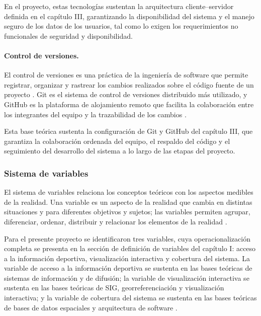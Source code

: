 En el proyecto, estas tecnolog\'ias sustentan la arquitectura cliente--servidor
definida en el cap\'itulo III, garantizando la disponibilidad del sistema y el
manejo seguro de los datos de los usuarios, tal como lo exigen los
requerimientos no funcionales de seguridad y disponibilidad.

\paragraph{Control de versiones.} El control de versiones es una pr\'actica de
la ingenier\'ia de software que permite registrar, organizar y rastrear los
cambios realizados sobre el c\'odigo fuente de un proyecto \citep{gitdocs}. Git
es el sistema de control de versiones distribuido m\'as utilizado, y GitHub es
la plataforma de alojamiento remoto que facilita la colaboraci\'on entre los
integrantes del equipo y la trazabilidad de los cambios \citep{githubdocs}.

Esta base te\'orica sustenta la configuraci\'on de Git y GitHub del cap\'itulo
III, que garantiza la colaboraci\'on ordenada del equipo, el respaldo del
c\'odigo y el seguimiento del desarrollo del sistema a lo largo de las etapas
del proyecto.

\subsubsection{Sistema de variables}

El sistema de variables relaciona los conceptos te\'oricos con los aspectos
medibles de la realidad. Una variable es un aspecto de la realidad que cambia
en distintas situaciones y para diferentes objetivos y sujetos; las variables
permiten agrupar, diferenciar, ordenar, distribuir y relacionar los elementos
de la realidad \citep{hernandez2014}.

Para el presente proyecto se identificaron tres variables, cuya
operacionalizaci\'on completa se presenta en la secci\'on de definici\'on de
variables del cap\'itulo I: acceso a la informaci\'on deportiva, visualizaci\'on
interactiva y cobertura del sistema. La variable de acceso a la informaci\'on
deportiva se sustenta en las bases te\'oricas de sistemas de informaci\'on y de
difusi\'on; la variable de visualizaci\'on interactiva se sustenta en las bases
te\'oricas de SIG, georreferenciaci\'on y visualizaci\'on interactiva; y la
variable de cobertura del sistema se sustenta en las bases te\'oricas de bases
de datos espaciales y arquitectura de software \citep{hernandez2014}.

